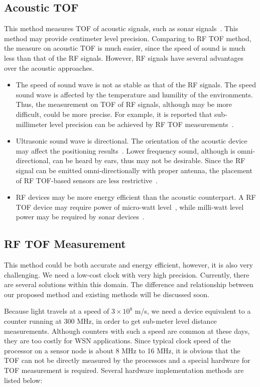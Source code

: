 \subsection{Acoustic TOF}
 This method measures TOF of acoustic signals, such as sonar signals~\cite{PariyanthaCricketBoardPhd}. This method may provide centimeter level precision. Comparing to RF TOF method, the measure on acoustic TOF is much easier, since the speed of sound is much less than that of the RF signals. However, RF signals have several advantages over the acoustic approaches.
 \begin{itemize}
   \item The speed of sound wave is not as stable as that of the RF signals. The speed sound wave is affected by the temperature and humility of the environments. Thus, the measurement on TOF of RF signals, although may be more difficult, could be more precise. For example, it is reported that sub-millimeter level precision can be achieved by RF TOF measurements~\cite{McEwanPen}.
   \item Ultrasonic sound wave is directional. The orientation of the acoustic device may affect the positioning results~\cite{PariyanthaCricketBoardPhd}. Lower frequency sound, although is omni-directional, can be heard by ears, thus may not be desirable. Since the RF signal can be emitted omni-directionally with proper antenna, the placement of RF TOF-based sensors are less restrictive~\cite{dutta06radar}.
   \item RF devices may be more energy efficient than the acoustic counterpart. A RF TOF device may require power of micro-watt level~\cite{MIR}, while milli-watt level power may be required by sonar devices~\cite{PariyanthaCricketBoardPhd}.
 \end{itemize}


\subsection{RF TOF Measurement}
 This method could be both accurate and energy efficient, however, it is also very challenging. We need a low-cost clock with very high precision. Currently, there are several solutions within this domain. The difference and relationship between our proposed method and existing methods will be discussed soon.

 Because light travels at a speed of $3\times10^8$ m/s, we need a device equivalent to a counter running at 300 MHz, in order to get sub-meter level distance measurements. Although counters with such a speed are common at these days, they are too costly for WSN applications.
  Since typical clock speed of the processor on a sensor node is about 8 MHz to 16 MHz, it is obvious that the TOF can not be directly measured by the processors and a special hardware for TOF measurement is required. Several hardware implementation methods are listed below:

